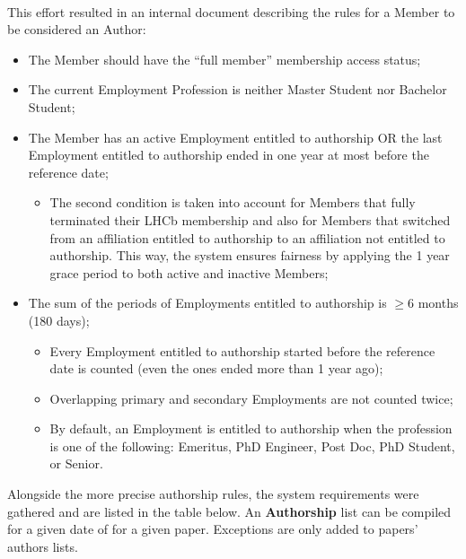\paragraph{} This effort resulted in an internal document describing the rules for a Member to be considered an Author:
\begin{itemize}
    \item The Member should have the ``full member'' membership access status;
    \item The current Employment Profession is neither Master Student nor Bachelor Student;
    \item The Member has an active Employment entitled to authorship OR the last Employment entitled to authorship ended in one year at most before the reference date;
    \begin{itemize}
        \item The second condition is taken into account for Members that fully terminated their LHCb membership and also for Members that switched from an affiliation entitled to authorship to an affiliation not entitled to authorship. This way, the system ensures fairness by applying the 1 year grace period to both active and inactive Members;
    \end{itemize}
    \item The sum of the periods of Employments entitled to authorship is $\geq 6$ months (180 days);
    \begin{itemize}
        \item Every Employment entitled to authorship started before the reference date is counted (even the ones ended more than 1 year ago);
        \item Overlapping primary and secondary Employments are not counted twice;
        \item By default, an Employment is entitled to authorship when the profession is one of the following: Emeritus, PhD Engineer, Post Doc, PhD Student, or Senior.
    \end{itemize}
\end{itemize}

\noindent
 Alongside the more precise authorship rules, the system requirements were gathered and are listed in the table below. An \textbf{Authorship} list can be compiled for a given date of for a given paper. Exceptions are only added to papers' authors lists. 

